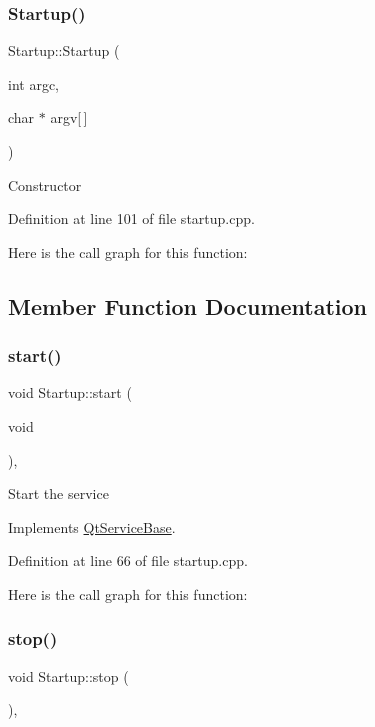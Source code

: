 \subsubsection{\texorpdfstring{Startup()}{Startup()}}
{\footnotesize\ttfamily Startup\+::\+Startup (\begin{DoxyParamCaption}\item[{int}]{argc,  }\item[{char $\ast$}]{argv\mbox{[}$\,$\mbox{]} }\end{DoxyParamCaption})}

Constructor 

Definition at line 101 of file startup.\+cpp.

Here is the call graph for this function\+:


\subsection{Member Function Documentation}
\mbox{\label{class_startup_abdcf9eed41611ee15a59ed00dc2fc2d8}} 
\subsubsection{\texorpdfstring{start()}{start()}}
{\footnotesize\ttfamily void Startup\+::start (\begin{DoxyParamCaption}\item[{void}]{ }\end{DoxyParamCaption})\hspace{0.3cm}{\ttfamily [protected]}, {\ttfamily [virtual]}}

Start the service 

Implements \mbox{\hyperlink{class_qt_service_base_adbc0cd621b41bd3a6a1f62fda432e9e4}{Qt\+Service\+Base}}.



Definition at line 66 of file startup.\+cpp.

Here is the call graph for this function\+:
\mbox{\label{class_startup_a7c9c2aff06377779ce1f801836bd11b3}} 
\subsubsection{\texorpdfstring{stop()}{stop()}}
{\footnotesize\ttfamily void Startup\+::stop (\begin{DoxyParamCaption}{ }\end{DoxyParamCaption})\hspace{0.3cm}{\ttfamily [protected]}, {\ttfamily [virtual]}}

